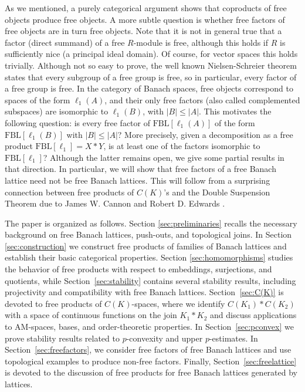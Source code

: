 \documentclass[12pt]{amsart}
\newcommand{\FBL}{\mathrm{FBL}}
\theoremstyle{plain}
\theoremstyle{definition}
\begin{document}
As we mentioned, a purely categorical argument shows that coproducts of free objects produce free objects. A more subtle question is whether free factors of free objects are in turn free objects. Note that it is not in general true that a factor (direct summand) of a free $R$-module is free, although this holds if $R$ is sufficiently nice (a principal ideal domain). Of course, for vector spaces this holds trivially. Although not so easy to prove, the well known Nielsen-Schreier theorem \cite[Proposition 3.8, p.16]{combgrouptheo} states that every subgroup of a free group is free, so in particular, every factor of a free group is free. In the category of Banach spaces, free objects correspond to spaces of the form $\ell_1(A)$, and their only free factors (also called complemented subspaces) are isomorphic to $\ell_1(B)$, with $|B|\leq |A|$. This motivates the following question: is every free factor of $\FBL[\ell_1(A)]$ of the form $\FBL[\ell_1(B)]$ with $|B|\leq|A|$? More precisely, given a decomposition as a free product $\FBL[\ell_1]=X*Y$, is at least one of the factors isomorphic to $\FBL[\ell_1]$? Although the latter remains open, we give some partial results in that direction. In particular, we will show that free factors of a free Banach lattice need not be free Banach lattices. This will follow from a surprising connection between free products of $C(K)$'s and the Double Suspension Theorem due to James W. Cannon and Robert D. Edwards \cite{Doublesusptheo}.

The paper is organized as follows. Section \ref{sec:preliminaries} recalls the necessary background on free Banach lattices, push-outs, and topological joins. In Section \ref{sec:construction} we construct free products of families of Banach lattices and establish their basic categorical properties. Section \ref{sec:homomorphisms} studies the behavior of free products with respect to embeddings, surjections, and quotients, while Section~\ref{sec:stability} contains several stability results, including projectivity and compatibility with free Banach lattices. Section~\ref{sec:C(K)} is devoted to free products of $C(K)$-spaces, where we identify $C(K_1)\ast C(K_2)$ with a space of continuous functions on the join $K_1\ast K_2$ and discuss applications to AM-spaces, bases, and order-theoretic properties. In Section~\ref{sec:pconvex} we prove stability results related to $p$-convexity and upper $p$-estimates. In Section~\ref{sec:freefactors}, we consider free factors of free Banach lattices and use topological examples to produce non-free factors. Finally, Section~\ref{sec:freelattice} is devoted to the discussion of free products for free Banach lattices generated by lattices.
\end{document}
